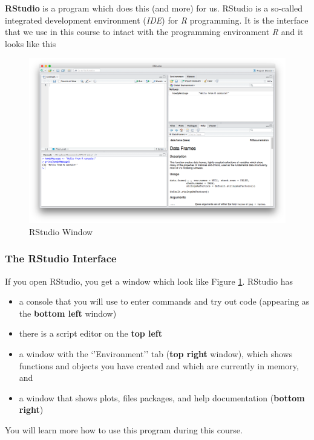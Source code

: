 \documentclass[
]{scrartcl}
\providecommand{\tightlist}{%
  \setlength{\itemsep}{0pt}\setlength{\parskip}{0pt}}
\begin{document}
\textbf{RStudio} is a program which does this (and more) for us. RStudio is a so-called integrated development environment (\emph{IDE}) for \emph{R} programming. It is the interface that we use in this course to intact with the programming environment \emph{R} and it looks like this

\begin{figure}
\includegraphics[width=650px]{images/rstudio} \caption{RStudio Window}\label{fig:rstudio}
\end{figure}

\hypertarget{the-rstudio-interface}{%
\subsubsection{The RStudio Interface}\label{the-rstudio-interface}}

If you open RStudio, you get a window which look like Figure \ref{fig:rstudio}. RStudio has

\begin{itemize}
\tightlist
\item
  a console that you will use to enter commands and try out code (appearing as the \textbf{bottom left} window)
\item
  there is a script editor on the \textbf{top left}
\item
  a window with the `'Environment'' tab (\textbf{top right} window), which shows functions and objects you have created and which are currently in memory, and
\item
  a window that shows plots, files packages, and help documentation (\textbf{bottom right})
\end{itemize}

You will learn more how to use this program during this course.
\end{document}
